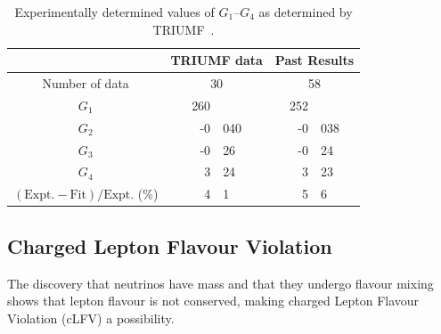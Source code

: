 \begin{table}
  \begin{center}
  \begin{tabular}{c | r@{.}l | r@{.}l }
                                                              & \multicolumn{2}{c|}{TRIUMF data} & \multicolumn{2}{c}{Past Results}  \\
    \hline
    Number of data                                            & \multicolumn{2}{c|}{30}          & \multicolumn{2}{c}{58}            \\
    \hline
    \( G_1 \)                                                 &             260 &                &              252 &                \\
    \( G_2 \)                                                 &              -0 & 040            &               -0 & 038            \\
    \( G_3 \)                                                 &              -0 & 26             &               -0 & 24             \\
    \( G_4 \)                                                 &               3 & 24             &                3 & 23             \\
    \hline
    \( (\textrm{Expt.} - \textrm{Fit})/\textrm{Expt.} \) (\%) &               4 & 1              &                5 & 6              \\
  \end{tabular}
  \end{center}
  \caption{Experimentally determined values of \( G_1 \)--\( G_4 \) as determined by TRIUMF~\cite{suzuki_mu_capture_rates}.}
  \label{tab:g1_to_g4}
\end{table}


\subsection{Charged Lepton Flavour Violation} %
\label{sec:charged_lepton_flavour_violation}
The discovery that neutrinos have mass and that they undergo flavour mixing shows that lepton flavour is not conserved, making charged Lepton Flavour Violation (cLFV) a possibility. 


